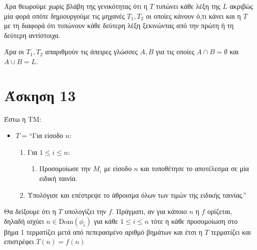 \documentclass[a4paper, oneside, 11pt]{article}
\theoremstyle{definition}
\begin{document}
Άρα θεωρούμε χωρίς βλάβη της γενικότητας ότι η $T$ τυπώνει κάθε λέξη της $L$ ακριβώς
μία φορά οπότε δημιουργούμε τις μηχανές $T_1, T_2$ οι οποίες κάνουν ό,τι κάνει και η
$T$ με τη διαφορά ότι τυπώνουν κάθε δεύτερη λέξη ξεκινώντας από την πρώτη ή τη
δεύτερη αντίστοιχα.

Άρα οι $T_1, T_2$ απαριθμούν τις άπειρες γλώσσες $A, B$ για τις οποίες $A \cap B =
\emptyset$ και $A \cup B = L$.

\section*{Άσκηση 13}

Έστω η ΤΜ:

\begin{itemize}
\item $T = $``Για είσοδο $n$:
      \begin{enumerate}
      \item Για $1 \leq i \leq n$:
            \begin{enumerate}
            \item Προσομοίωσε την $M_i$ με είσοδο $n$ και τοποθέτησε το αποτέλεσμα σε
                  μία ειδική ταινία.
            \end{enumerate}
      \item Υπολόγισε και επέστρεψε το άθροισμα όλων των τιμών της ειδικής ταινίας.''
      \end{enumerate}
\end{itemize}

Θα δείξουμε ότι η $T$ υπολογίζει την $f$. Πράγματι, αν για κάποιο $n$ η $f$ ορίζεται,
δηλαδή ισχύει
$n \in \text{Dom}(\phi_i)$ για κάθε $1 \leq i \leq n$ τότε η 
κάθε προσομοίωση στο βήμα 1 τερματίζει μετά από πεπερασμένο αριθμό βημάτων και έτσι η
$T$ τερματίζει και επιστρέφει $T(n) = f(n)$
\end{document}
